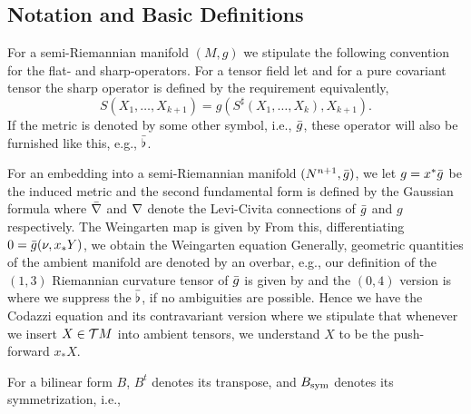 \subsection{Notation and Basic Definitions}
\label{subsec:bg_notation}

For a semi-Riemannian manifold $(M,g)$ we stipulate the following convention for the flat- and sharp-operators. For a tensor field
let
 and for a pure covariant tensor the sharp operator is defined by the requirement
equivalently,
\[S(X_{1},\dots, X_{k+1})=g(S^{\sharp}(X_{1},\dots, X_{k}),X_{k+1}).\]
If the metric is denoted by some other symbol, i.e., $\-g$, these operator will also be furnished like this, e.g., $\-\flat$.

For an embedding into a semi-Riemannian manifold $(N^{n+1},\-g)$, 
we let $g=x^{*}\-g$ be the induced metric and the second fundamental form is defined by the Gaussian formula
where $\-\n$ and $\n$ denote the Levi-Civita connections of $\-g$ and $g$ respectively. The Weingarten map is given by
From this, differentiating $0=\-g(\nu,{x_{*}Y})$, we obtain the Weingarten equation
Generally, geometric quantities of the ambient manifold are denoted by an overbar, e.g., our definition of the $(1,3)$ Riemannian curvature tensor of $\-g$ is given by
and the $(0,4)$ version is
where we suppress the $\-\flat$, if no ambiguities are possible.
Hence we have the Codazzi equation
and its contravariant version
where we stipulate that whenever we insert $X\in \mc{T}M$ into ambient tensors, we understand $X$ to be the push-forward $x_{*}X.$

For a bilinear form $B$, $B^t$ denotes its transpose,
and $B_{\mrm{sym}}$ denotes its symmetrization, i.e.,


